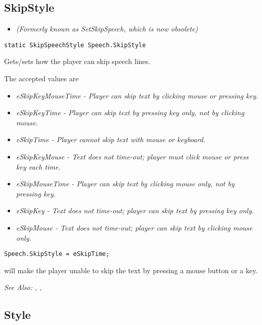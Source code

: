 \subsection{SkipStyle}\label{Speech.SkipStyle}%

\begin{itemize}
\item \it{(Formerly known as SetSkipSpeech, which is now obsolete)}
\end{itemize}

\begin{verbatim}
static SkipSpeechStyle Speech.SkipStyle
\end{verbatim}

Gets/sets how the player can skip speech lines.

The accepted values are
\begin{itemize}
\item \it{eSkipKeyMouseTime} - Player can skip text by clicking mouse or pressing key.
\item \it{eSkipKeyTime} - Player can skip text by pressing key only, not by clicking mouse.
\item \it{eSkipTime} - Player cannot skip text with mouse or keyboard.
\item \it{eSkipKeyMouse} - Text does not time-out; player must click mouse or press key each time.
\item \it{eSkipMouseTime} - Player can skip text by clicking mouse only, not by pressing key.
\item \it{eSkipKey} - Text does not time-out; player can skip text by pressing key only.
\item \it{eSkipMouse} - Text does not time-out; player can skip text by clicking mouse only.
\end{itemize}

\begin{verbatim}
Speech.SkipStyle = eSkipTime;
\end{verbatim}
will make the player unable to skip the text by pressing a mouse button or a key.

\it{See Also:} ,
,


\subsection{Style}\label{Speech.Style}%

